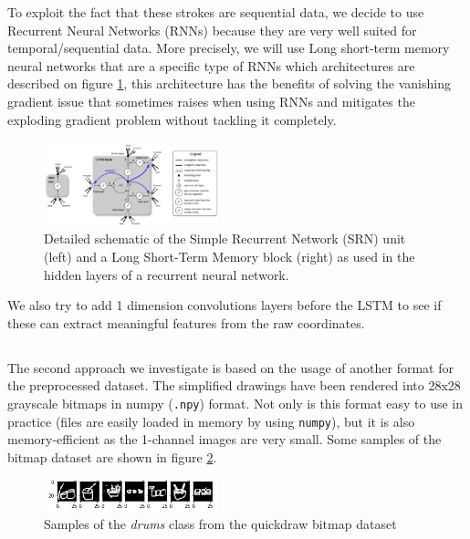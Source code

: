 \documentclass[10pt,twocolumn,letterpaper]{article}
\begin{document}
To exploit the fact that these strokes are sequential data, we decide to use Recurrent Neural Networks (RNNs) because they are very well suited for temporal/sequential data. More precisely, we will use Long short-term memory neural networks \cite{DBLP:journals/corr/GreffSKSS15} that are a specific type of RNNs which architectures are described on figure \ref{fig:lstm}, this architecture has the benefits of solving the vanishing gradient issue that sometimes raises when using RNNs and mitigates the exploding gradient problem without tackling it completely.



\begin{figure}[h] 
\centering
\includegraphics[width=0.45\textwidth]{images/lstm.png}
\caption{Detailed schematic of the Simple Recurrent Network (SRN) unit (left) and a Long Short-Term Memory block (right) as used in the hidden layers of
a recurrent neural network. \cite[p.~2]{DBLP:journals/corr/GreffSKSS15}}
\label{fig:lstm}
\end{figure}

We also try to add 1 dimension convolutions layers before the LSTM to see if these can extract meaningful features from the raw coordinates.

\subsection{\cnnTitle{}}

The second approach we investigate is based on the usage of another format for the preprocessed dataset. The simplified drawings have been rendered into 28x28 grayscale bitmaps in numpy (\texttt{.npy}) format. Not only is this format easy to use in practice (files are easily loaded in memory by using \texttt{numpy}), but it is also memory-efficient as the 1-channel images are very small. Some samples of the bitmap dataset are shown in figure \ref{fig:bitmap_drums}.

\begin{figure}[h] 
\centering
\includegraphics[width=0.45\textwidth]{images/bitmaps_drums.png}
\caption{Samples of the \textit{drums} class from the quickdraw bitmap dataset}
\label{fig:bitmap_drums}
\end{figure}
\end{document}
